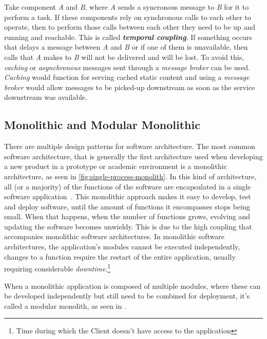 Take component \textit{A} and \textit{B}, where \textit{A} sends a syncronous message to \textit{B} for it to perform a task. If these components rely on synchronous calls to each other to operate, then to perform those calls between each other they need to be up and running and reachable. This is called \textbf{\textit{temporal coupling}}. If something occurs that delays a message between \textit{A} and \textit{B} or if one of them is unavailable, then calls that \textit{A} makes to \textit{B} will not be delivered and will be lost. To avoid this, \textit{caching} or \textit{asynchronous} messages sent through a \textit{message broker} can be used. \textit{Caching} would function for serving cached static content and using a \textit{message broker} would allow messages to be picked-up downstream as soon as the service downstream was available.




\subsection{Monolithic and Modular Monolithic}\label{state-of-the-art:ss:monolithic-or-modular-and-their-differences}

There are multiple design patterns for software architecture. The most common software architecture, that is generally the first architecture used when developing a new product in a prototype or academic environment is a monolithic architecture, as seen in \cref{fig:single-process-monolith}. In this kind of architecture, all (or a majority) of the functions of the software are encapsulated in a single software application~\Parencite{chen_li_li_2017}. This monolithic approach makes it easy to develop, test and deploy software, until the amount of functions it encompasses stops being small. When that happens, when the number of functions grows, evolving and updating the software becomes unwieldy. This is due to the high coupling that accompanies monolithic software architectures. In monolithic software architectures, the application's modules cannot be executed independently, changes to a function require the restart of the entire application, usually requiring considerable \textit{downtime}.\footnote{\label{foot:downtime}Time during which the Client doesn't have access to the application}



When a monolithic application is composed of multiple modules, where these can be developed independently but still need to be combined for deployment, it's called a modular monolith, as seen in . 

